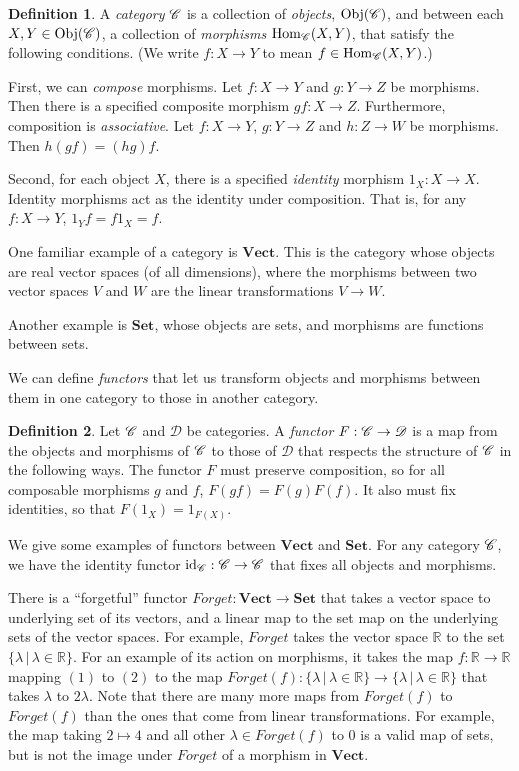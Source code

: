 \documentclass[a4paper,12pt,leqno]{article} \usepackage{amsmath}
\newcommand{\RR}{\mathbb{R}} \newcommand{\QQ}{\mathbb{Q}}
\newcommand{\curD}{\mathscr{D}} \newcommand{\curI}{\mathscr{I}}
\newcommand{\id}{\ensuremath{\operatorname{id}}}
\newcommand{\Hom}{\ensuremath{\operatorname{Hom}}}
\newcommand{\Obj}{\ensuremath{\operatorname{Obj}}}
\theoremstyle{definition}
\newtheorem{defn}{Definition}
\begin{document}
\begin{defn}
  A \emph{category} $\mathscr{C}$ is a collection of \emph{objects}, $\Obj(\curC)$,
  and between each $X, Y\in\Obj(\curC)$, a collection of \emph{morphisms}
  $\Hom_{\curC}(X, Y)$, that satisfy the following conditions.
  (We write $f: X\to Y$ to mean $f\in \Hom_{\curC}(X, Y)$.)

  First, we can \emph{compose} morphisms.
  Let $f: X\to Y$ and $g: Y\to Z$ be morphisms.
  Then there is a specified composite morphism $gf: X\to Z$.
  Furthermore, composition is \emph{associative}.
  Let $f: X\to Y$, $g: Y\to Z$ and $h: Z\to W$ be morphisms.
  Then $h(gf) = (hg)f$.

  Second, for each object $X$, there is a specified \emph{identity} morphism
  $1_X: X\to X$.
  Identity morphisms act as the identity under composition.
  That is, for any $f: X\to Y$, $1_Yf = f1_X = f$.
\end{defn}

One familiar example of a category is $\textbf{Vect}$.
This is the category whose objects are real vector spaces (of all dimensions),
where the morphisms between two vector spaces $V$ and $W$ are the linear
transformations $V\to W$.

Another example is $\textbf{Set}$, whose objects are sets, and morphisms are
functions between sets.

We can define \emph{functors} that let us transform objects and morphisms between them in
one category to those in another category.

\begin{defn}
  Let $\mathscr{C}$ and $\curD$ be categories.
  A \emph{functor} $F: \curC\to \curD$ is a map from the objects and morphisms
  of $\mathscr{C}$ to those of $\curD$ that respects the structure of $\mathscr{C}$ in the
  following ways.
  The functor $F$ must preserve composition, so for all composable morphisms
  $g$ and $f$, $F(gf) = F(g)F(f)$.
  It also must fix identities, so that $F(1_X) = 1_{F(X)}$.
\end{defn}

We give some examples of functors between $\textbf{Vect}$ and $\textbf{Set}$.
For any category $\mathscr{C}$, we have the identity functor $\id_{\curC}:
\curC\to \curC$ that fixes all objects and morphisms.

There is a ``forgetful'' functor $Forget: \textbf{Vect}\to \textbf{Set}$ that
takes a vector space to underlying set of its vectors, and a linear map to the
set map on the underlying sets of the vector spaces.
For example, $Forget$ takes the vector space $\RR$ to the set $\{\lambda\,|\,
\lambda\in\RR\}$.
For an example of its action on morphisms, it takes the map $f: \RR\to\RR$
mapping $(1)$ to $(2)$ to the map
$Forget(f): \{\lambda\,|\,\lambda\in\RR\}\to \{\lambda\,|\,\lambda\in\RR\}$
that takes $\lambda$ to $2\lambda$.
Note that there are many more maps from $Forget(f)$ to $Forget(f)$ than the
ones that come from linear transformations.
For example, the map taking $2\mapsto 4$ and all other $\lambda\in Forget(f)$
to $0$ is a valid map of sets, but is not the image under $Forget$ of
a morphism in $\textbf{Vect}$.
\end{document}
